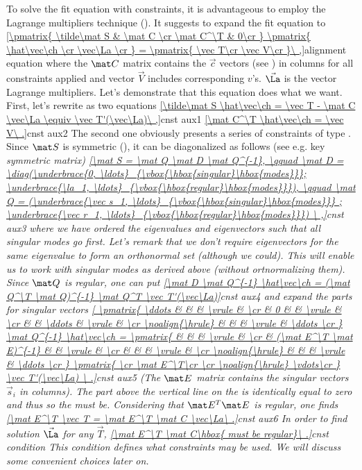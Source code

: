 To solve the fit equation with constraints, it is advantageous to employ the Lagrange multipliers technique (). It suggests to expand the fit equation to 
\eqref{\pmatrix{
\tilde\mat S & \mat C \cr
\mat C^\T & 0\cr
} \pmatrix{
\hat\vec\ch \cr
\vec\La \cr
} = \pmatrix{
\vec T\cr
\vec V\cr
}\ ,}{alignment equation}
where the $\mat C$ matrix contains the $\vec c$ vectors (see ) in columns for all constraints applied and vector $\vec V$ includes corresponding $v$'s. $\vec\La$ is the vector Lagrange multipliers. Let's demonstrate that this equation does what we want. First, let's rewrite as two equations
\eqref{\tilde\mat S \hat\vec\ch = \vec T - \mat C \vec\La \equiv \vec T'(\vec\La)\ ,}{cnst aux1}
\eqref{\mat C^\T \hat\vec\ch = \vec V\ .}{cnst aux2}
The second one obviously presents a series of constraints of type . Since $\mat S$ is symmetric (), it can be diagonalized as follows (see e.g.  key \em{symmetric matrix})
\eqref{\mat S = \mat Q \mat D \mat Q^{-1}, \qquad
\mat D = \diag(\underbrace{0, \ldots}_{\vbox{\hbox{singular}\hbox{modes}}}; \underbrace{\la_1, \ldots}_{\vbox{\hbox{regular}\hbox{modes}}}), \qquad
\mat Q = (\underbrace{\vec s_1, \ldots}_{\vbox{\hbox{singular}\hbox{modes}}} ; \underbrace{\vec r_1, \ldots}_{\vbox{\hbox{regular}\hbox{modes}}})
\ ,}{cnst aux3}
where we have ordered the eigenvalues and eigenvectors such that all singular modes go first. Let's remark that we don't require eigenvectors for the same eigenvalue to form an orthonormal set (although we could). This will enable us to work with singular modes as derived above (without ortnormalizing them). Since $\mat Q$ is regular, one can put
\eqref{\mat D \mat Q^{-1} \hat\vec\ch = (\mat Q^\T \mat Q)^{-1} \mat Q^T \vec T'(\vec\La)}{cnst aux4}
and expand the parts for singular vectors
\eqref{
\pmatrix{
\ddots & & & \vrule & \cr
& 0 & & \vrule & \cr
& & \ddots & \vrule & \cr
\noalign{\hrule}
 & & & \vrule & \ddots \cr
}
\mat Q^{-1} \hat\vec\ch = 
\pmatrix{
& & & \vrule & \cr
& (\mat E^\T \mat E)^{-1} & & \vrule & \cr
& & & \vrule & \cr
\noalign{\hrule}
 & & & \vrule & \ddots \cr
}
\pmatrix{
\cr
\mat E^\T\cr
\cr
\noalign{\hrule}
\vdots\cr
}
\vec T'(\vec\La)
\ .}{cnst aux5}
(The $\mat E$ matrix contains the singular vectors $\vec s_i$ in columns). The part above the vertical line on the \lhs{} is identically equal to zero and thus so the \rhs{} must be. Considering that $\mat E^T \mat E$ is regular, one finds
\eqref{\mat E^\T \vec T = \mat E^\T \mat C \vec\La\ .}{cnst aux6}
In order to find solution $\vec\La$ for any $\vec T$,
\eqref{\mat E^\T \mat C\hbox{ must be regular}\ .}{cnst condition}
This condition defines what constraints may be used. We will discuss some convenient choices later on.

